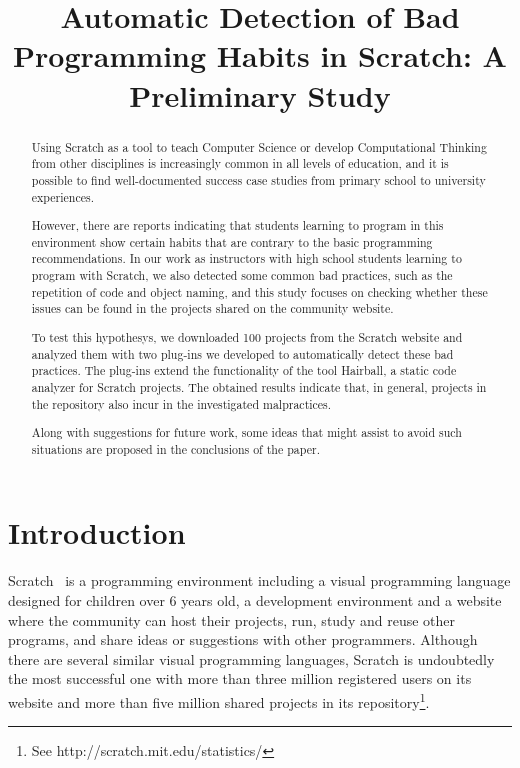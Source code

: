 \documentclass[conference]{format/IEEEtran}
\title{Automatic Detection of Bad Programming Habits in Scratch: A Preliminary Study}
\author{\IEEEauthorblockN{Jesús Moreno}
\IEEEauthorblockA{INTEF \& Programamos.es\\
Madrid, Spain\\
jesus.moreno@programamos.es}
\and
\IEEEauthorblockN{Gregorio Robles}
\IEEEauthorblockA{GSyC/LibreSoft\\Universidad Rey Juan Carlos\\
Madrid, Spain\\
grex@gsyc.urjc.es}}
\begin{document}
\maketitle

\begin{abstract}
Using Scratch as a tool to teach Computer Science or develop Computational Thinking from other disciplines is increasingly common in all levels of education, and it is possible to find well-documented success case studies from primary school to university experiences.

However, there are reports indicating that students learning to program in this environment show certain habits that are contrary to the basic programming recommendations. In our work as instructors with high school students learning to program with Scratch, we also detected some common bad practices, such as the repetition of code and object naming, and this study focuses on checking whether these issues can be found in the projects shared on the community website. 

To test this hypothesys, we downloaded 100 projects from the Scratch website and analyzed them with two plug-ins we developed to automatically detect these bad practices. The plug-ins extend the functionality of the tool Hairball, a static code analyzer for Scratch projects. The obtained results indicate that, in general, projects in the repository also incur in the investigated malpractices.

Along with suggestions for future work, some ideas that might assist to avoid such situations are proposed in the conclusions of the paper.

\end{abstract}

\section{Introduction}

Scratch~\cite{resnick2009scratch}  is a programming environment including a visual programming language designed for children over 6 years old, a development environment and a website where the community can host their projects, run, study and reuse other programs, and share ideas or suggestions with other programmers. Although there are several similar visual programming languages, Scratch is undoubtedly the most successful one with more than three million registered users on its website and more than five million shared projects in its repository\footnote{See http://scratch.mit.edu/statistics/}.
\end{document}
